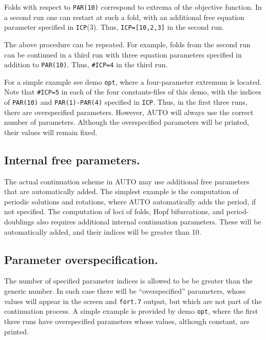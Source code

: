 \documentclass[12pt]{report}
\begin{document}
Folds with respect to {\tt PAR(10)} correspond to extrema of the objective function.
In a second run one can restart at such a fold, with an additional
free equation parameter specified in {\tt ICP}(3).
Thus, {\tt ICP=[10,2,3]} in the second run.

The above procedure can be repeated.
For example, folds from the second run can be continued in a third run
with three equation parameters specified in addition to {\tt PAR(10)}.
Thus, {\tt \#ICP=4} in the third run.

For a simple example see demo {\tt opt}, where a four-parameter extremum
is located.
Note that {\tt \#ICP=5} in each of the four constants-files of this demo, 
with the indices of {\tt PAR(10)} and {\tt PAR(1)-PAR(4)} specified in {\tt ICP}.
Thus, in the first three runs, there are overspecified parameters.
However, {\cal AUTO} will always use the correct number of parameters.
Although the overspecified parameters will be printed, their values will
remain fixed. 

\subsection{ Internal free parameters.}
The actual continuation scheme in {\cal AUTO} may use additional free
parameters that are automatically added.
The simplest example is the computation of periodic solutions and rotations,
where {\cal AUTO} automatically adds the period, if not specified.
The computation of loci of folds, Hopf bifurcations, and period-doublings
also requires additional internal continuation parameters.
These will be automatically added, and their indices will be greater
than 10.


\subsection{ Parameter overspecification.} \label{sec:Parameter_over_specification}
The number of specified parameter indices is allowed to be be greater 
than the generic number.
In such case there will be ``overspecified'' parameters, whose values
will appear in the screen and {\tt fort.7} output, but which are not
part of the continuation process.
A simple example is provided by demo {\tt opt}, where the first three runs
have overspecified parameters whose values, although constant, are printed.
\end{document}
